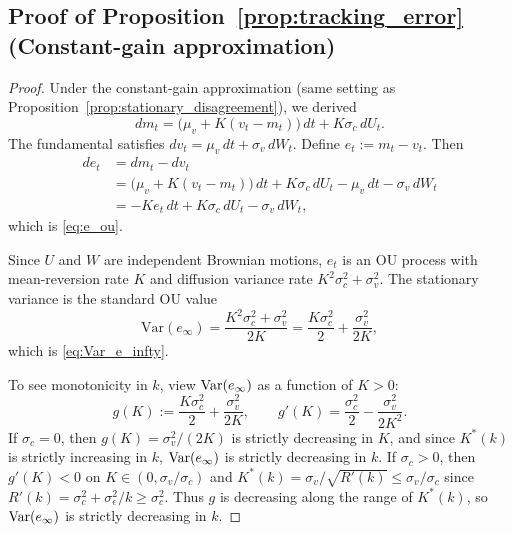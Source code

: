 \subsection*{Proof of Proposition~\ref{prop:tracking_error} (Constant-gain approximation)}
\begin{proof}
Under the constant-gain approximation (same setting as Proposition~\ref{prop:stationary_disagreement}), we derived
\[
dm_t=\big(\mu_v+K(v_t-m_t)\big)\,dt+K\sigma_c\,dU_t.
\]
The fundamental satisfies $dv_t=\mu_v\,dt+\sigma_v\,dW_t$. Define $e_t:=m_t-v_t$.
Then
\[
\begin{aligned}
de_t
&=dm_t-dv_t\\
&=\big(\mu_v+K(v_t-m_t)\big)\,dt+K\sigma_c\,dU_t-\mu_v\,dt-\sigma_v\,dW_t\\
&=-K e_t\,dt+K\sigma_c\,dU_t-\sigma_v\,dW_t,
\end{aligned}
\]
which is \eqref{eq:e_ou}.

Since $U$ and $W$ are independent Brownian motions, $e_t$ is an OU process with mean-reversion rate $K$ and diffusion variance rate
$K^2\sigma_c^2+\sigma_v^2$. The stationary variance is the standard OU value
\[
\mathrm{Var}(e_\infty)=\frac{K^2\sigma_c^2+\sigma_v^2}{2K}
=\frac{K\sigma_c^2}{2}+\frac{\sigma_v^2}{2K},
\]
which is \eqref{eq:Var_e_infty}.

To see monotonicity in $k$, view $\text{Var}(e_\infty)$ as a function of $K>0$:
\[
g(K):=\frac{K\sigma_c^2}{2}+\frac{\sigma_v^2}{2K},
\qquad
g'(K)=\frac{\sigma_c^2}{2}-\frac{\sigma_v^2}{2K^2}.
\]
If $\sigma_c=0$, then $g(K)=\sigma_v^2/(2K)$ is strictly decreasing in $K$, and since $K^*(k)$ is strictly increasing in $k$,
$\text{Var}(e_\infty)$ is strictly decreasing in $k$.
If $\sigma_c>0$, then $g'(K)<0$ on $K\in(0,\sigma_v/\sigma_c)$ and $K^*(k)=\sigma_v/\sqrt{R'(k)}\le \sigma_v/\sigma_c$ since
$R'(k)=\sigma_c^2+\sigma_\epsilon^2/k\ge \sigma_c^2$. Thus $g$ is decreasing along the range of $K^*(k)$, so $\text{Var}(e_\infty)$ is
strictly decreasing in $k$.
\end{proof}


